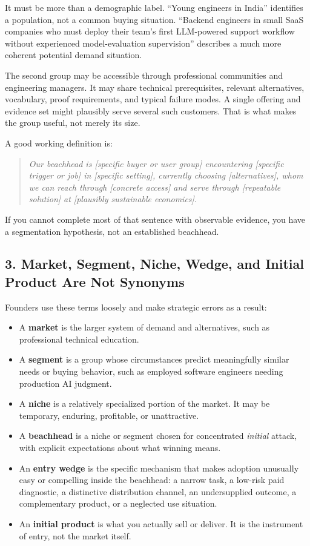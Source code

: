 It must be more than a demographic label. ``Young engineers in India'' identifies a population, not a common buying situation. ``Backend engineers in small SaaS companies who must deploy their team's first LLM-powered support workflow without experienced model-evaluation supervision'' describes a much more coherent potential demand situation.

The second group may be accessible through professional communities and engineering managers. It may share technical prerequisites, relevant alternatives, vocabulary, proof requirements, and typical failure modes. A single offering and evidence set might plausibly serve several such customers. That is what makes the group useful, not merely its size.

A good working definition is:

\begin{quote}
\emph{Our beachhead is [specific buyer or user group] encountering [specific trigger or job] in [specific setting], currently choosing [alternatives], whom we can reach through [concrete access] and serve through [repeatable solution] at [plausibly sustainable economics].}
\end{quote}

If you cannot complete most of that sentence with observable evidence, you have a segmentation hypothesis, not an established beachhead.

\subsection*{3. Market, Segment, Niche, Wedge, and Initial Product Are Not Synonyms}

Founders use these terms loosely and make strategic errors as a result:

\begin{itemize}
    \item A \textbf{market} is the larger system of demand and alternatives, such as professional technical education.
    \item A \textbf{segment} is a group whose circumstances predict meaningfully similar needs or buying behavior, such as employed software engineers needing production AI judgment.
    \item A \textbf{niche} is a relatively specialized portion of the market. It may be temporary, enduring, profitable, or unattractive.
    \item A \textbf{beachhead} is a niche or segment chosen for concentrated \emph{initial} attack, with explicit expectations about what winning means.
    \item An \textbf{entry wedge} is the specific mechanism that makes adoption unusually easy or compelling inside the beachhead: a narrow task, a low-risk paid diagnostic, a distinctive distribution channel, an undersupplied outcome, a complementary product, or a neglected use situation.
    \item An \textbf{initial product} is what you actually sell or deliver. It is the instrument of entry, not the market itself.
\end{itemize}

